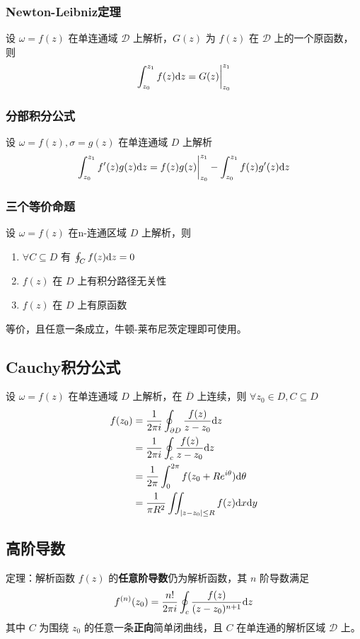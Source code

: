 \documentclass[./main.tex]{subfiles}
\begin{document}
\subsubsection{Newton-Leibniz定理}
设 $\omega=f(z)$ 在单连通域 $\mathscr{D}$ 上解析，$G(z)$ 为 $f(z)$ 在 $\mathscr{D}$ 上的一个原函数，则
\begin{equation}
    \int_{z_0}^{z_1}f(z)\text{d}z=G(z)\bigg|_{z_0}^{z_1}
\end{equation}
\subsubsection{分部积分公式}
设 $\omega=f(z),\sigma=g(z)$ 在单连通域 $D$ 上解析
\begin{equation}
    \int_{z_0}^{z_1}f'(z)g(z)\text{d}z=f(z)g(z)\bigg|_{z_0}^{z_1}-\int_{z_0}^{z_1}f(z)g'(z)\text{d}z
\end{equation}
\subsubsection{三个等价命题}
设 $\omega=f(z)$ 在n-连通区域 $D$ 上解析，则
\begin{enumerate}[(1)]
    \item $\forall C\subseteq D$ 有 $\oint_Cf(z)\text{d}z=0$
    \item $f(z)$ 在 $D$ 上有积分路径无关性
    \item $f(z)$ 在 $D$ 上有原函数
\end{enumerate}
等价，且任意一条成立，牛顿-莱布尼茨定理即可使用。
\subsection{Cauchy积分公式}
设 $\omega=f(z)$ 在单连通域 $D$ 上解析，在 $\overline{D}$ 上连续，则 $\forall z_0\in D,C\subseteq D$
\begin{align}
    f(z_0)&=\frac{1}{2\pi i}\oint_{\partial D}\frac{f(z)}{z-z_0}\text{d}z\\
    &=\frac{1}{2\pi i}\oint_c\frac{f(z)}{z-z_0}\text{d}z\\&=\frac{1}{2\pi}\int_0^{2\pi}f(z_0+Re^{i\theta})\text{d}\theta\\&=\frac{1}{\pi R^2}\iint_{|z-z_0|\le R}f(z)\text{d}x\text{d}y
\end{align}
\subsection{高阶导数}
定理：解析函数 $f(z)$ 的\textbf{任意阶导数}仍为解析函数，其 $n$ 阶导数满足
\begin{equation}\label{thm:gjds}
    f^{(n)}(z_0)=\frac{n!}{2\pi i}\oint_c\frac{f(z)}{(z-z_0)^{n+1}}\text{d}z
\end{equation}
其中 $C$ 为围绕 $z_0$ 的任意一条\textbf{正向}简单闭曲线，且 $C$ 在单连通的解析区域 $\mathscr{D}$ 上。
\end{document}
